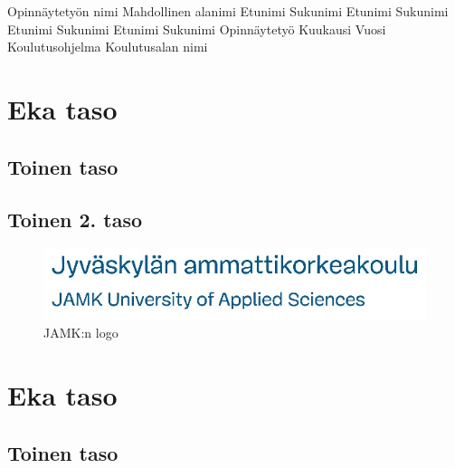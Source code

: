\documentclass{jamk}
\begin{document}
\makejamktitle
    {Opinnäytetyön nimi}     %
    {Mahdollinen alanimi}    %
    {Etunimi Sukunimi}   %
    {Etunimi Sukunimi}   %
    {Etunimi Sukunimi}   %
    {Etunimi Sukunimi}%
    {Opinnäytetyö}           %
    {Kuukausi Vuosi}         %
    {Koulutusohjelma}        %
    {Koulutusalan nimi}      %

\section{Eka taso}
\lipsum[1]
\lipsum[2]

\subsection{Toinen taso}
\lipsum[1]
\lipsum[2]
\lipsum[3]
\lipsum[4]

\subsection{Toinen 2. taso}
\lipsum[1]
\begin{figure}
  \includegraphics{jamkfi_long.png}
  \caption{JAMK:n logo}
  \label{}
\end{figure}
\lipsum[2]
\lipsum[3]

\section{Eka taso}
\lipsum[1]

\subsection{Toinen taso}
\lipsum[1]
\lipsum[2]
\lipsum[3]
\end{document}
